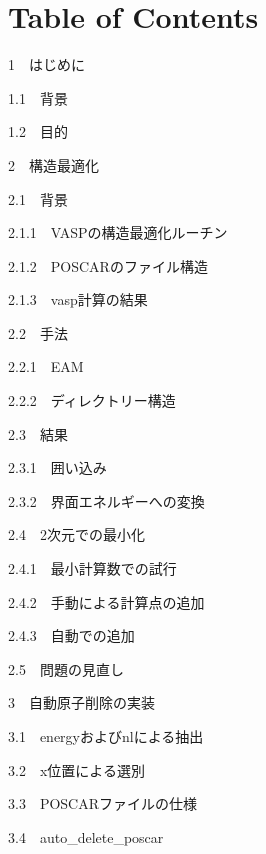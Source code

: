\chapter{Table of Contents}\label{table-of-contents}

{1~~}はじめに

{1.1~~}背景

{1.2~~}目的

{2~~}構造最適化

{2.1~~}背景

{2.1.1~~}VASPの構造最適化ルーチン

{2.1.2~~}POSCARのファイル構造

{2.1.3~~}vasp計算の結果

{2.2~~}手法

{2.2.1~~}EAM

{2.2.2~~}ディレクトリー構造

{2.3~~}結果

{2.3.1~~}囲い込み

{2.3.2~~}界面エネルギーへの変換

{2.4~~}2次元での最小化

{2.4.1~~}最小計算数での試行

{2.4.2~~}手動による計算点の追加

{2.4.3~~}自動での追加

{2.5~~}問題の見直し

{3~~}自動原子削除の実装

{3.1~~}energyおよびnlによる抽出

{3.2~~}x位置による選別

{3.3~~}POSCARファイルの仕様

{3.4~~}auto\_delete\_poscar

    